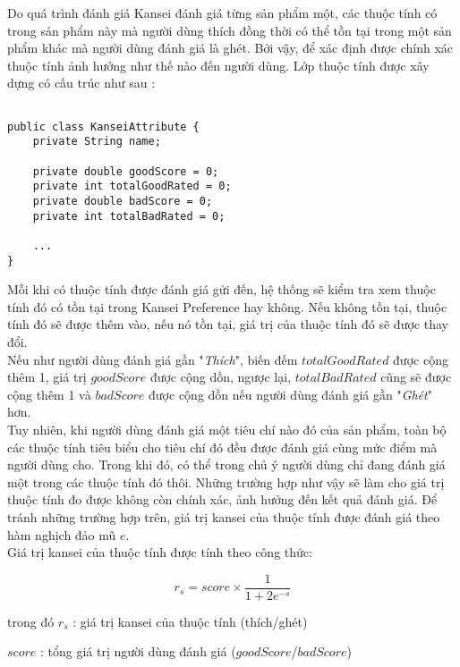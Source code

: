 Do quá trình đánh giá Kansei đánh giá từng sản phẩm một, các thuộc tính có trong sản phẩm này mà người dùng thích đồng thời có thể tồn tại trong một sản phẩm khác mà người dùng đánh giá là ghét. Bởi vậy, để xác định được chính xác thuộc tính ảnh hưởng như thế nào đến người dùng. Lớp thuộc tính được xây dựng có cấu trúc như sau :

\begin{lstlisting}[style=javacode, breaklines=true]

public class KanseiAttribute {
    private String name;

    private double goodScore = 0;
    private int totalGoodRated = 0;
    private double badScore = 0;
    private int totalBadRated = 0;
    
    ...
}
\end{lstlisting}

Mỗi khi có thuộc tính được đánh giá gửi đến, hệ thống sẽ kiểm tra xem thuộc tính đó có tồn tại trong Kansei Preference hay không. Nếu không tồn tại, thuộc tính đó sẽ được thêm vào, nếu nó tồn tại, giá trị của thuộc tính đó sẽ được thay đổi.\\

Nếu như người dùng đánh giá gần "\textit{Thích}", biến đếm $totalGoodRated$ được cộng thêm 1, giá trị $goodScore$ được cộng dồn, ngược lại, $totalBadRated$ cũng sẽ được cộng thêm 1 và $badScore$ được cộng dồn nếu người dùng đánh giá gần "\textit{Ghét}" hơn.\\

Tuy nhiên, khi người dùng đánh giá một tiêu chí nào đó của sản phẩm, toàn bộ các thuộc tính tiêu biểu cho tiêu chí đó đều được đánh giá cùng mức điểm mà người dùng cho. Trong khi đó, có thể trong chủ ý người dùng chỉ đang đánh giá một trong các thuộc tính đó thôi. Những trường hợp như vậy sẽ làm cho giá trị thuộc tính đo được không còn chính xác, ảnh hưởng đến kết quả đánh giá. Để tránh những trường hợp trên, giá trị kansei của thuộc tính được đánh giá theo hàm nghịch đảo mũ $e$.\\ 


Giá trị kansei của thuộc tính được tính theo công thức: 

\begin{equation}
r_s = score \times \dfrac{1}{1+2e^{-s}} 
\end{equation}

trong đó $r_s$ : giá trị kansei của thuộc tính (thích/ghét)

$score$ : tổng giá trị người dùng đánh giá ($goodScore$/$badScore$)

